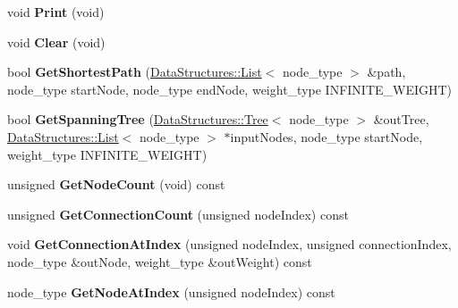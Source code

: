 \begin{DoxyCompactItemize}
\item 
\hypertarget{class_data_structures_1_1_weighted_graph_ae3903323e2315b7cb2850a8ff1fcbf76}{void {\bfseries Print} (void)}\label{class_data_structures_1_1_weighted_graph_ae3903323e2315b7cb2850a8ff1fcbf76}

\item 
\hypertarget{class_data_structures_1_1_weighted_graph_ae728c1f41989d531588829916f7b28ae}{void {\bfseries Clear} (void)}\label{class_data_structures_1_1_weighted_graph_ae728c1f41989d531588829916f7b28ae}

\item 
\hypertarget{class_data_structures_1_1_weighted_graph_ae7fcebbbd48228744e31a6c4d1750e9e}{bool {\bfseries Get\-Shortest\-Path} (\hyperlink{class_data_structures_1_1_list}{Data\-Structures\-::\-List}$<$ node\-\_\-type $>$ \&path, node\-\_\-type start\-Node, node\-\_\-type end\-Node, weight\-\_\-type I\-N\-F\-I\-N\-I\-T\-E\-\_\-\-W\-E\-I\-G\-H\-T)}\label{class_data_structures_1_1_weighted_graph_ae7fcebbbd48228744e31a6c4d1750e9e}

\item 
\hypertarget{class_data_structures_1_1_weighted_graph_af6ae09481c0c13f41def60dc4ed6a9f1}{bool {\bfseries Get\-Spanning\-Tree} (\hyperlink{class_data_structures_1_1_tree}{Data\-Structures\-::\-Tree}$<$ node\-\_\-type $>$ \&out\-Tree, \hyperlink{class_data_structures_1_1_list}{Data\-Structures\-::\-List}$<$ node\-\_\-type $>$ $\ast$input\-Nodes, node\-\_\-type start\-Node, weight\-\_\-type I\-N\-F\-I\-N\-I\-T\-E\-\_\-\-W\-E\-I\-G\-H\-T)}\label{class_data_structures_1_1_weighted_graph_af6ae09481c0c13f41def60dc4ed6a9f1}

\item 
\hypertarget{class_data_structures_1_1_weighted_graph_a66f4034521b47d5e331b0f08a37afc36}{unsigned {\bfseries Get\-Node\-Count} (void) const }\label{class_data_structures_1_1_weighted_graph_a66f4034521b47d5e331b0f08a37afc36}

\item 
\hypertarget{class_data_structures_1_1_weighted_graph_a67427257d69b16e530f8e9bdfed7e6bb}{unsigned {\bfseries Get\-Connection\-Count} (unsigned node\-Index) const }\label{class_data_structures_1_1_weighted_graph_a67427257d69b16e530f8e9bdfed7e6bb}

\item 
\hypertarget{class_data_structures_1_1_weighted_graph_a3a2958a36405b1c4e441c5560e660813}{void {\bfseries Get\-Connection\-At\-Index} (unsigned node\-Index, unsigned connection\-Index, node\-\_\-type \&out\-Node, weight\-\_\-type \&out\-Weight) const }\label{class_data_structures_1_1_weighted_graph_a3a2958a36405b1c4e441c5560e660813}

\item 
\hypertarget{class_data_structures_1_1_weighted_graph_ad53ce73bf226c91905d0d81c97c1a4db}{node\-\_\-type {\bfseries Get\-Node\-At\-Index} (unsigned node\-Index) const }\label{class_data_structures_1_1_weighted_graph_ad53ce73bf226c91905d0d81c97c1a4db}

\end{DoxyCompactItemize}
